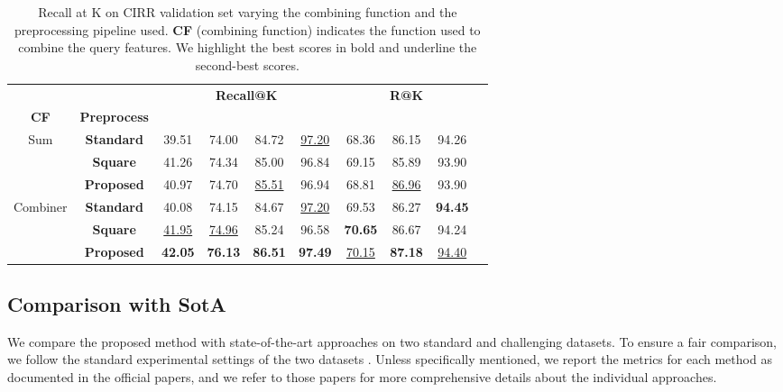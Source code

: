 \documentclass[acmlarge]{acmart}
\begin{document}
\begin{table}[tb]
\centering
\begin{tabular}{ccc  cccc ccc}
  \toprule
&& \multicolumn{4}{c}{\textbf{Recall@K}} & \multicolumn{3}{c}{\textbf{R@K}} \\
\cmidrule(lr){3-6}
\cmidrule(lr){7-9}
\textbf{CF} & \textbf{Preprocess}  &  &  &   &  &   &  &   \\
\midrule
\multirow{3}{*}{Sum} & \textbf{Standard} & 39.51 & 74.00 & 84.72 & \underline{97.20} & 68.36 & 86.15 & 94.26 \\ &\textbf{Square} & 41.26 & 74.34 & 85.00 & 96.84 & 69.15 & 85.89 & 93.90 \\ &\textbf{Proposed}  & 40.97 & 74.70 & \underline{85.51} & 96.94 & 68.81 & \underline{86.96} & 93.90 \\ \midrule[.02em]
\multirow{3}{*}{Combiner} & \textbf{Standard} &  40.08 & 74.15 & 84.67 & \underline{97.20} & 69.53 & 86.27 & \textbf{94.45} \\ &\textbf{Square} & \underline{41.95} & \underline{74.96} & 85.24 & 96.58 & \textbf{70.65} & 86.67 & 94.24 \\ & \textbf{Proposed} & \textbf{42.05} & \textbf{76.13} & \textbf{86.51} & \textbf{97.49} & \underline{70.15} & \textbf{87.18} & \underline{94.40} \\ \bottomrule
\end{tabular}
\caption{Recall at K on CIRR validation set varying the combining function and the preprocessing pipeline used. \textbf{CF} (combining function) indicates the function used to combine the query features. We highlight the best scores in bold and underline the second-best scores.}
\label{tab:cirr-preprocess}
\vspace{-4ex}
\end{table}

\subsection{Comparison with SotA}
We compare the proposed method with state-of-the-art approaches on two standard and challenging datasets.
To ensure a fair comparison, we follow the standard experimental settings of the two datasets \cite{wu2021fashion, liu2021image}. 
Unless specifically mentioned, we report the metrics for each method as documented in the official papers, and we refer to those papers for more comprehensive details about the individual approaches.
\end{document}
